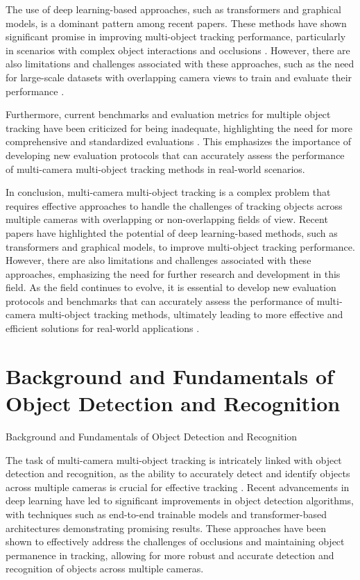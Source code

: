 \documentclass[conference]{IEEEtran}
\begin{document}
The use of deep learning-based approaches, such as transformers and graphical models, is a dominant pattern among recent papers. These methods have shown significant promise in improving multi-object tracking performance, particularly in scenarios with complex object interactions and occlusions \cite{MCTR: Multi Camera Tracking Transformer}. However, there are also limitations and challenges associated with these approaches, such as the need for large-scale datasets with overlapping camera views to train and evaluate their performance \cite{MCTR: Multi Camera Tracking Transformer}.

Furthermore, current benchmarks and evaluation metrics for multiple object tracking have been criticized for being inadequate, highlighting the need for more comprehensive and standardized evaluations \cite{Tracking the Trackers: An Analysis of the State of the Art in Multiple Object Tracking}. This emphasizes the importance of developing new evaluation protocols that can accurately assess the performance of multi-camera multi-object tracking methods in real-world scenarios.

In conclusion, multi-camera multi-object tracking is a complex problem that requires effective approaches to handle the challenges of tracking objects across multiple cameras with overlapping or non-overlapping fields of view. Recent papers have highlighted the potential of deep learning-based methods, such as transformers and graphical models, to improve multi-object tracking performance. However, there are also limitations and challenges associated with these approaches, emphasizing the need for further research and development in this field. As the field continues to evolve, it is essential to develop new evaluation protocols and benchmarks that can accurately assess the performance of multi-camera multi-object tracking methods, ultimately leading to more effective and efficient solutions for real-world applications \cite{The Challenge of Multi-Camera Tracking}.

\section{Background and Fundamentals of Object Detection and Recognition}
Background and Fundamentals of Object Detection and Recognition

The task of multi-camera multi-object tracking is intricately linked with object detection and recognition, as the ability to accurately detect and identify objects across multiple cameras is crucial for effective tracking \cite{Challenge of Multi-Camera Tracking}. Recent advancements in deep learning have led to significant improvements in object detection algorithms, with techniques such as end-to-end trainable models \cite{Learning to Track with Object Permanence} and transformer-based architectures \cite{MCTR: Multi Camera Tracking Transformer} demonstrating promising results. These approaches have been shown to effectively address the challenges of occlusions and maintaining object permanence in tracking, allowing for more robust and accurate detection and recognition of objects across multiple cameras.
\end{document}
